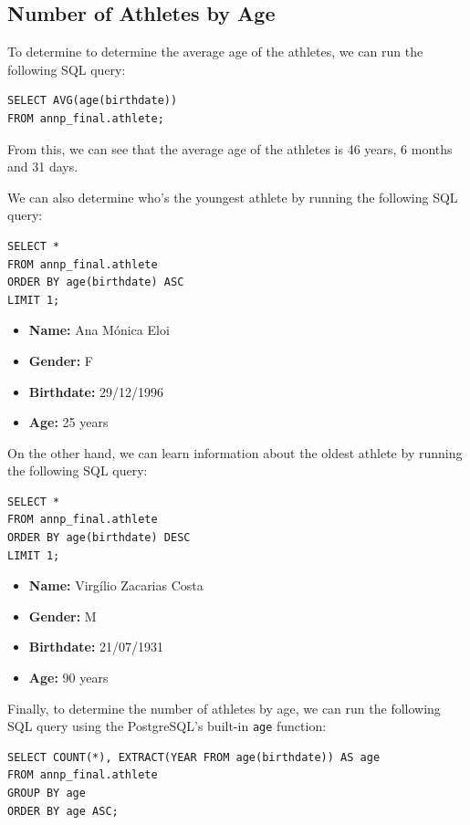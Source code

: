 \subsection{Number of Athletes by Age}\label{subsec:number-of-athletes-by-age}

To determine to determine the average age of the athletes, we can run the following SQL query:

\begin{verbatim}
SELECT AVG(age(birthdate))
FROM annp_final.athlete;
\end{verbatim}

From this, we can see that the average age of the athletes is 46 years, 6 months and 31 days.

We can also determine who's the youngest athlete by running the following SQL query:

\begin{verbatim}
SELECT *
FROM annp_final.athlete
ORDER BY age(birthdate) ASC
LIMIT 1;
\end{verbatim}

\begin{itemize}
    \item \textbf{Name:} Ana Mónica Eloi
    \item \textbf{Gender:} F
    \item \textbf{Birthdate:} 29/12/1996
    \item \textbf{Age:} 25 years
\end{itemize}

On the other hand, we can learn information about the oldest athlete by running the following SQL query:

\begin{verbatim}
SELECT *
FROM annp_final.athlete
ORDER BY age(birthdate) DESC
LIMIT 1;
\end{verbatim}

\begin{itemize}
    \item \textbf{Name:} Virgílio Zacarias Costa
    \item \textbf{Gender:} M
    \item \textbf{Birthdate:} 21/07/1931
    \item \textbf{Age:} 90 years
\end{itemize}

Finally, to determine the number of athletes by age, we can run the following SQL query using the PostgreSQL's built-in
\texttt{age} function:

\begin{verbatim}
SELECT COUNT(*), EXTRACT(YEAR FROM age(birthdate)) AS age
FROM annp_final.athlete
GROUP BY age
ORDER BY age ASC;
\end{verbatim}


